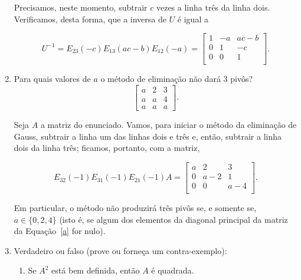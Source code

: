 \documentclass[leqno]{article}
\begin{document}
\begin{enumerate}
\begin{sol}
	\noindent Precisamos, neste momento, subtrair $c$ vezes a linha três da linha dois. Verificamos, desta forma, que a inversa de $U$ é igual a 

	\begin{equation*} 
		U^{-1} = E_{23}(-c)E_{13}(ac - b)E_{12}(-a) = 
		\begin{bmatrix} 
			1 & -a & ac - b \\ 
			0 & 1 & -c \\ 
			0 & 0 & 1 \\ 
		\end{bmatrix}.  
	\end{equation*} 
\end{sol} 

\item Para quais valores de $a$ o método de eliminação não dará 3 pivôs?
$$\begin{bmatrix} 
a & 2 & 3  \\
a & a & 4  \\
a & a & a 
\end{bmatrix}.$$

\begin{sol} 
	Seja $A$ a matriz do enunciado. Vamos, para iniciar o método da eliminação de Gauss, subtrair a linha um das linhas dois e três e, então, subtrair a linha dois da linha três; ficamos, portanto, com a matriz, 

	\begin{equation} \label{a} 
		E_{32}(-1)E_{31}(-1)E_{21}(-1)A = 
		\begin{bmatrix} 
			a & 2 & 3 \\ 
			0 & a - 2 & 1 \\ 
			0 & 0 & a - 4 \\ 
		\end{bmatrix}.  
	\end{equation} 

	\noindent Em particular, o método não produzirá três pivôs se, e somente se, $a \in \{0, 2, 4\}$ (isto é, se algum dos elementos da diagonal principal da matriz da Equação~\eqref{a} for nulo). 
\end{sol} 

\item Verdadeiro ou falso (prove ou forneça um contra-exemplo):

\begin{enumerate}

\item Se $A^2$ está bem definida, então $A$ é quadrada.


\end{enumerate}
\end{enumerate}
\end{document}
